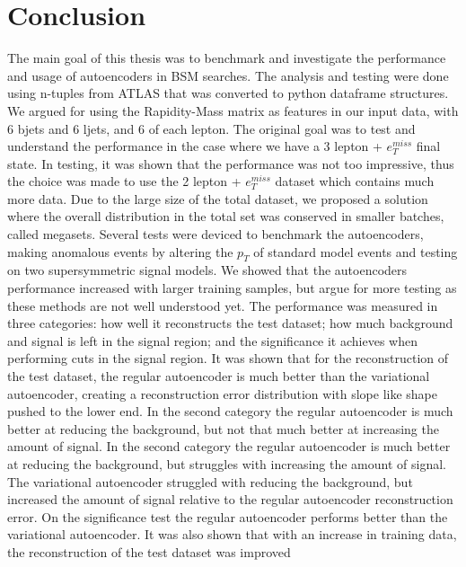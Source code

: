 \chapter{Conclusion}


The main goal of this thesis was to benchmark and investigate the performance and usage of
autoencoders in BSM searches. The analysis and testing were done using 
n-tuples from ATLAS that was converted to python dataframe structures. We argued for using 
the Rapidity-Mass matrix as features in our input data, with 6 bjets and 6 ljets, and 6 
of each lepton. The original goal was to test and understand the performance in the case
where we have a 3 lepton + $e_T^{miss}$ final state. In testing, it was shown that the 
performance was not too impressive, thus the choice was made to use the 2 lepton + $e_T^{miss}$ dataset which 
contains much more data. Due to the large size of the total dataset, we proposed a solution
where the overall distribution in the total set was conserved in smaller batches, called 
megasets. Several tests were deviced to benchmark the autoencoders, 
making anomalous events by altering the $p_T$ of standard model events and testing on two 
supersymmetric signal models. We showed that the autoencoders performance increased with 
larger training samples, but argue for more testing as these methods are not well 
understood yet. The performance was measured in three categories: how well it reconstructs 
the test dataset; how much background and signal is left in the signal region; and 
the significance it achieves when performing cuts in the signal region. It was shown that
for the reconstruction of the test dataset, the regular autoencoder is much better than the variational autoencoder, 
creating a reconstruction error distribution with slope like shape pushed to the lower end. 
In the second category the regular autoencoder is much better at 
reducing the background, but not that much better at increasing the amount of signal. 
In the second category the regular autoencoder is much better at reducing the background, 
but struggles with increasing the amount of signal. The variational autoencoder struggled with
reducing the background, but increased the amount of signal relative to the regular autoencoder reconstruction error. 
On the significance test
 the regular autoencoder performs better than the variational autoencoder. 
It was also shown that with an increase in training data, the reconstruction of the test dataset was improved 
